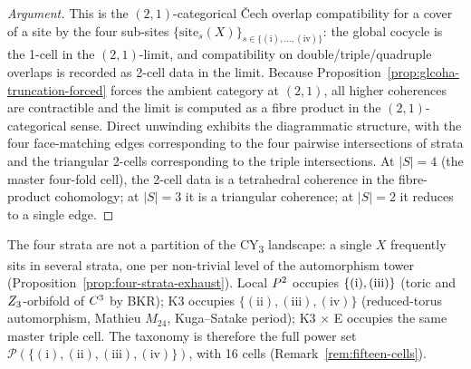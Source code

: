 \begin{proof}[Argument]
This is the $(2,1)$-categorical Čech overlap compatibility for a
cover of a site by the four sub-sites
$\{\mathrm{site}_s(X)\}_{s \in \{(\text{i}), \ldots, (\text{iv})\}}$:
the global cocycle is the 1-cell in the $(2,1)$-limit, and
compatibility on double/triple/quadruple overlaps is recorded as
2-cell data in the limit. Because
Proposition~\ref{prop:glcoha-truncation-forced} forces the ambient
category at $(2,1)$, all higher coherences are contractible and
the limit is computed as a fibre product in the
$(2,1)$-categorical sense. Direct unwinding exhibits the
diagrammatic structure, with the four face-matching edges
corresponding to the four pairwise intersections of strata and
the triangular 2-cells corresponding to the triple intersections.
At $|S| = 4$ (the master four-fold cell), the 2-cell data is a
tetrahedral coherence in the fibre-product cohomology; at
$|S| = 3$ it is a triangular coherence; at $|S| = 2$ it reduces
to a single edge.
\end{proof}

\begin{remark}
\label{rem:strata-not-partition}
The four strata are not a partition of the CY\textsubscript{3}
landscape: a single $X$ frequently sits in several strata, one per
non-trivial level of the automorphism tower
(Proposition~\ref{prop:four-strata-exhaust}). Local $P^2$ occupies
$\{(\text i), (\text{iii})\}$ (toric and $Z_3$-orbifold of
$C^3$ by BKR); K3 occupies $\{(\text{ii}), (\text{iii}),
(\text{iv})\}$ (reduced-torus automorphism, Mathieu $M_{24}$,
Kuga--Satake period); K3 $\times$ E occupies the same master triple
cell. The taxonomy is therefore the full power set
$\mathcal{P}(\{(\text{i}), (\text{ii}), (\text{iii}),
(\text{iv})\})$, with 16 cells
(Remark~\ref{rem:fifteen-cells}).
\end{remark}

